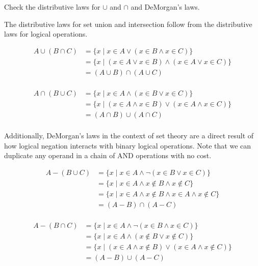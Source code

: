 \documentclass{zupan}
\begin{document}
\begin{problem}{1}
  Check the distributive laws for $\cup$ and $\cap$ and DeMorgan's laws.
\end{problem}

\begin{solution}
  The distributive laws for set union and intersection follow from the
  distributive laws for logical operations.

  \[
    \begin{aligned}
      A \cup (B \cap C)
        & = \{x \mid x \in A \lor (x \in B \land x \in C)\} \\
        & = \{x \mid (x \in A \lor x \in B) \land (x \in A \lor x \in C)\} \\
        & = (A \cup B) \cap (A \cup C) \\
    \end{aligned}
  \]

  \[
    \begin{aligned}
      A \cap (B \cup C)
        & = \{x \mid x \in A \land (x \in B \lor x \in C)\} \\
        & = \{x \mid (x \in A \land x \in B) \lor (x \in A \land x \in C)\} \\
        & = (A \cap B) \cup (A \cap C) \\
    \end{aligned}
  \]

  Additionally, DeMorgan's laws in the context of set theory are a direct
  result of how logical negation interacts with binary logical operations. Note
  that we can duplicate any operand in a chain of AND operations with no cost.

  \[
    \begin{aligned}
      A - (B \cup C)
        & = \{x \mid x \in A \land \neg (x \in B \lor x \in C)\} \\
        & = \{x \mid x \in A \land x \notin B \land x \notin C\} \\
        & = \{x \mid x \in A \land x \notin B \land x \in A \land x \notin C\} \\
        & = (A - B) \cap (A - C) \\
    \end{aligned}
  \]

  \[
    \begin{aligned}
      A - (B \cap C)
        & = \{x \mid x \in A \land \neg (x \in B \land x \in C)\} \\
        & = \{x \mid x \in A \land (x \notin B \lor x \notin C)\} \\
        & = \{x \mid (x \in A \land x \notin B) \lor (x \in A \land x \notin C)\} \\
        & = (A - B) \cup (A - C) \\
    \end{aligned}
  \]
\end{solution}
\end{document}
